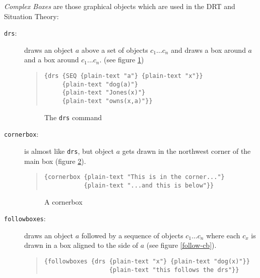 {\it Complex Boxes\/} are those graphical objects which are used
in the DRT and Situation Theory:

\begin{description}
\item[{\tt drs}:] draws an object $a$ above a set of objects $c_1 ...
c_n$ and draws a box around $a$ and a box around $c_1 ... c_n$. (see
figure \ref{drs-cb})

\begin{quote}
\begin{verbatim}
{drs {SEQ {plain-text "a"} {plain-text "x"}} 
     {plain-text "dog(a)"} 
     {plain-text "Jones(x)"}
     {plain-text "owns(x,a)"}}
\end{verbatim}
\end{quote} 

\begin{figure}[h]
\begin{center}
\leavevmode
{}
\caption{The {\tt drs} command}
\label{drs-cb}
\end{center}
\end{figure}

\item[{\tt cornerbox}:] is almost like {\tt drs}, but object $a$ gets
drawn in the northwest corner of the main box (figure \ref{corner-cb}).

\begin{quote}
\begin{verbatim}
{cornerbox {plain-text "This is in the corner..."} 
           {plain-text "...and this is below"}}
\end{verbatim}
\end{quote}

\begin{figure}[hb]
\begin{center}
\leavevmode
{}
\caption{A cornerbox}
\label{corner-cb}
\end{center}
\end{figure}

\item[{\tt followboxes}:] draws an object $a$ followed by a sequence of
objects $c_1 ... c_n$ where each $c_x$ is drawn in a box aligned to the
side of $a$ (see figure \ref{follow-cb}).

\begin{quote}
\begin{verbatim}
{followboxes {drs {plain-text "x"} {plain-text "dog(x)"}}
                  {plain-text "this follows the drs"}}
\end{verbatim}
\end{quote}


\end{description}
